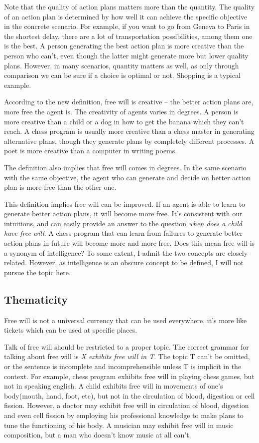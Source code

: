 Note that the quality of action plans matters more than the quantity. The quality of an action plan is determined by how well it can achieve the specific objective in the concrete scenario. For example, if you want to go from Geneva to Paris in the shortest delay, there are a lot of transportation possibilities, among them one is the best. A person generating the best action plan is more creative than the person who can’t, even though the latter might generate more but lower quality plans. However, in many scenarios, quantity matters as well, as only through comparison we can be sure if a choice is optimal or not. Shopping is a typical example.

According to the new definition, free will is creative -- the better action plans are, more free the agent is. The creativity of agents varies in degrees. A person is more creative than a child or a dog in how to get the banana which they can’t reach. A chess program is usually more creative than a chess master in generating alternative plans, though they generate plans by completely different processes. A poet is more creative than a computer in writing poems.

The definition also implies that free will comes in degrees. In the same scenario with the same objective, the agent who can generate and decide on better action plan is more free than the other one.

This definition implies free will can be improved. If an agent is able to learn to generate better action plans, it will become more free. It’s consistent with our intuitions, and can easily provide an answer to the question \emph{when does a child have free will}. A chess program that can learn from failures to generate better action plans in future will become more and more free. Does this mean free will is a synonym of intelligence? To some extent, I admit the two concepts are closely related. However, as intelligence is an obscure concept to be defined, I will not pursue the topic here.

\subsection{Thematicity}

Free will is not a universal currency that can be used everywhere, it's more like tickets which can be used at specific places.

Talk of free will should be restricted to a proper topic. The correct grammar for talking about free will is \emph{X exhibits free will in T}. The topic T can’t be omitted, or the sentence is incomplete and incomprehensible unless T is implicit in the context. For example, chess program exhibits free will in playing chess games, but not in speaking english. A child exhibits free will in movements of one’s body(mouth, hand, foot, etc), but not in the circulation of blood, digestion or cell fission. However, a doctor may exhibit free will in circulation of blood, digestion and even cell fission by employing his professional knowledge to make plans to tune the functioning of his body. A musician may  exhibit free will in music composition, but a man who doesn’t know music at all can’t.

